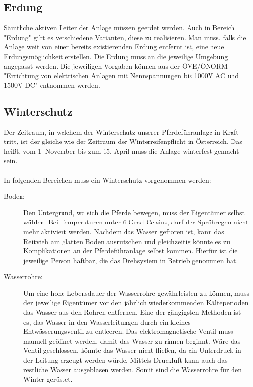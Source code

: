 \subsection{Erdung \cite{erdung}}
\label{sec:erdung}

Sämtliche aktiven Leiter der Anlage müssen geerdet werden. Auch in Bereich "{}Erdung"{} gibt es verschiedene Varianten, diese zu realisieren. Man muss, falls die Anlage weit von einer bereits existierenden Erdung entfernt ist, eine neue Erdungsmöglichkeit erstellen. Die Erdung muss an die jeweilige Umgebung angepasst werden. Die jeweiligen Vorgaben können aus der ÖVE/ÖNORM "{}Errichtung von elektrischen Anlagen mit Nennspannungen bis 1000V AC und 1500V DC"{} entnommen werden. 

\newpage

\subsection{Winterschutz}
\label{sec:winterschutz}

Der Zeitraum, in welchem der Winterschutz unserer Pferdeführanlage in Kraft tritt, ist der gleiche wie der Zeitraum der Winterreifenpflicht in Österreich. Das heißt, vom 1. November bis zum 15. April muss die Anlage winterfest gemacht sein. 
\\
\\
In folgenden Bereichen muss ein Winterschutz vorgenommen werden:
\begin{description}
\item[Boden:]
Den Untergrund, wo sich die Pferde bewegen, muss der Eigentümer selbst wählen. Bei Temperaturen unter 6 Grad Celsius, darf der Sprühregen nicht mehr aktiviert werden. Nachdem das Wasser gefroren ist, kann das Reitvieh am glatten Boden ausrutschen und gleichzeitig könnte es zu Komplikationen an der Pferdeführanlage selbst kommen. Hierfür ist die jeweilige Person haftbar, die das Drehsystem in Betrieb genommen hat.

\item[Wasserrohre:]

Um eine hohe Lebensdauer der Wasserrohre gewährleisten zu können, muss der jeweilige Eigentümer vor den jährlich wiederkommenden Kälteperioden das Wasser aus den Rohren entfernen. Eine der gängigsten Methoden ist es, das Wasser in den Wasserleitungen durch ein kleines Entwässerungsventil zu entleeren. Das elektromagnetische Ventil muss manuell geöffnet werden, damit das Wasser zu rinnen beginnt. Wäre das Ventil geschlossen, könnte das Wasser nicht fließen, da ein Unterdruck in der Leitung erzeugt werden würde. Mittels Druckluft kann auch das restliche Wasser ausgeblasen werden. Somit sind die Wasserrohre für den Winter gerüstet.

\end{description}

